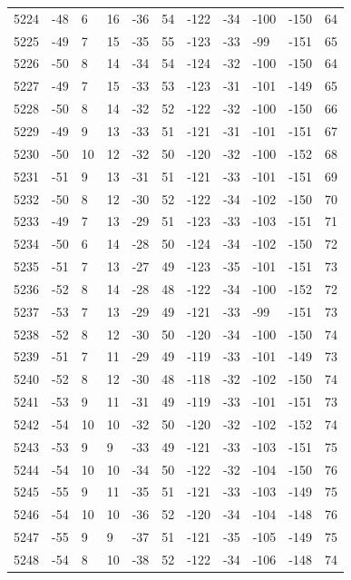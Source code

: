 \begin{table}[H]
\begin{tabular}{lllllllllll}
5224 & -48 & 6 & 16 & -36 & 54 & -122 & -34 & -100 & -150 & 64 \\
5225 & -49 & 7 & 15 & -35 & 55 & -123 & -33 & -99 & -151 & 65 \\
5226 & -50 & 8 & 14 & -34 & 54 & -124 & -32 & -100 & -150 & 64 \\
5227 & -49 & 7 & 15 & -33 & 53 & -123 & -31 & -101 & -149 & 65 \\
5228 & -50 & 8 & 14 & -32 & 52 & -122 & -32 & -100 & -150 & 66 \\
5229 & -49 & 9 & 13 & -33 & 51 & -121 & -31 & -101 & -151 & 67 \\
5230 & -50 & 10 & 12 & -32 & 50 & -120 & -32 & -100 & -152 & 68 \\
5231 & -51 & 9 & 13 & -31 & 51 & -121 & -33 & -101 & -151 & 69 \\
5232 & -50 & 8 & 12 & -30 & 52 & -122 & -34 & -102 & -150 & 70 \\
5233 & -49 & 7 & 13 & -29 & 51 & -123 & -33 & -103 & -151 & 71 \\
5234 & -50 & 6 & 14 & -28 & 50 & -124 & -34 & -102 & -150 & 72 \\
5235 & -51 & 7 & 13 & -27 & 49 & -123 & -35 & -101 & -151 & 73 \\
5236 & -52 & 8 & 14 & -28 & 48 & -122 & -34 & -100 & -152 & 72 \\
5237 & -53 & 7 & 13 & -29 & 49 & -121 & -33 & -99 & -151 & 73 \\
5238 & -52 & 8 & 12 & -30 & 50 & -120 & -34 & -100 & -150 & 74 \\
5239 & -51 & 7 & 11 & -29 & 49 & -119 & -33 & -101 & -149 & 73 \\
5240 & -52 & 8 & 12 & -30 & 48 & -118 & -32 & -102 & -150 & 74 \\
5241 & -53 & 9 & 11 & -31 & 49 & -119 & -33 & -101 & -151 & 73 \\
5242 & -54 & 10 & 10 & -32 & 50 & -120 & -32 & -102 & -152 & 74 \\
5243 & -53 & 9 & 9 & -33 & 49 & -121 & -33 & -103 & -151 & 75 \\
5244 & -54 & 10 & 10 & -34 & 50 & -122 & -32 & -104 & -150 & 76 \\
5245 & -55 & 9 & 11 & -35 & 51 & -121 & -33 & -103 & -149 & 75 \\
5246 & -54 & 10 & 10 & -36 & 52 & -120 & -34 & -104 & -148 & 76 \\
5247 & -55 & 9 & 9 & -37 & 51 & -121 & -35 & -105 & -149 & 75 \\
5248 & -54 & 8 & 10 & -38 & 52 & -122 & -34 & -106 & -148 & 74 \\

\end{tabular}
\end{table}

